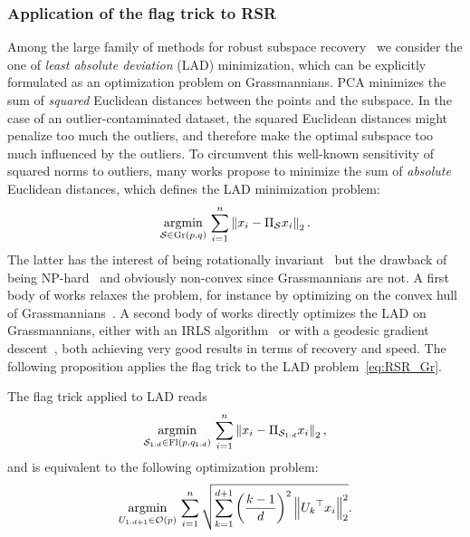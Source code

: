 \subsubsection{Application of the flag trick to RSR}
Among the large family of methods for robust subspace recovery~\citep{lerman_overview_2018} we consider the one of \textit{least absolute deviation} (LAD) minimization, which can be explicitly formulated as an optimization problem on Grassmannians.
PCA minimizes the sum of \textit{squared} Euclidean distances between the points and the subspace. In the case of an outlier-contaminated dataset, the squared Euclidean distances might penalize too much the outliers, and therefore make the optimal subspace too much influenced by the outliers. To circumvent this well-known sensitivity of squared norms to outliers, many works propose to minimize the sum of \textit{absolute} Euclidean distances, which defines the LAD minimization problem:
\begin{equation}\label{eq:RSR_Gr}
    \underset{\mathcal{S} \in \operatorname{Gr}(p, q)}{\operatorname{argmin}} \, \sum_{i=1}^n \left\lVert x_i - \Pi_{\mathcal{S}} x_i\right\rVert_2.
\end{equation}
The latter has the interest of being rotationally invariant~\citep{ding_r1-pca_2006} but the drawback of being NP-hard~\citep{mccoy_two_2011, lerman_overview_2018} and obviously non-convex since Grassmannians are not.  %
A first body of works relaxes the problem, for instance by optimizing on the convex hull of Grassmannians~\citep{mccoy_two_2011, xu_robust_2012, zhang_novel_2014, lerman_robust_2015}.
A second body of works directly optimizes the LAD on Grassmannians, either with an IRLS algorithm~\citep{lerman_fast_2018} or with a geodesic gradient descent~\citep{maunu_well-tempered_2019}, both achieving very good results in terms of recovery and speed.
The following proposition applies the flag trick to the LAD problem~\eqref{eq:RSR_Gr}.
\begin{proposition}\label{prop:RSR}
The flag trick applied to LAD reads
\begin{equation}\label{eq:RSR_Fl}
    \underset{\mathcal{S}_{1:d} \in \operatorname{Fl}(p, q_{1:d})}{\operatorname{argmin}} \, \sum_{i=1}^n \left\lVert x_i - \Pi_{\mathcal{S}_{1:d}} x_i\right\rVert_2,
\end{equation} 
and is equivalent to the following optimization problem:
\begin{equation}\label{eq:RSR_Fl_equiv}
	\underset{U_{1:d+1} \in \mathcal{O}(p)}{\operatorname{argmin}} \, \sum_{i=1}^n \sqrt{\sum_{k=1}^{d+1} \left(\frac {k-1} {d}\right)^2 \left\lVert{U_k}^\top x_i\right\rVert_2^2}.
\end{equation}
\end{proposition}
